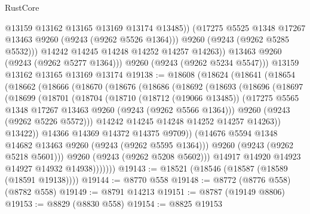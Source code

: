 \begin{lexlean}{RustCore}
\begin{coremodule}
                  @13159
                  @13162
                  @13165
                  @13169
                  @13174
                  @13485))
              (@17275 @5525 @1348 @17267 @13463 @9260 (@9243 (@9262 @5526 @1364)))
              @9260
              (@9243 (@9262 @5285 @5532)))
            @14242
            @14245
            @14248
            @14252
            @14257
            @14263))
        @13463
        @9260
        (@9243 (@9262 @5277 @1364)))
      @9260
      (@9243 (@9262 @5234 @5547)))
    @13159
    @13162
    @13165
    @13169
    @13174
@19138 := @18608
    (@18624
      (@18641
        (@18654
          (@18662
            (@18666
              (@18670
                (@18676
                  (@18686
                    (@18692
                      (@18693
                        (@18696
                          (@18697
                            (@18699
                              (@18701
                                (@18704
                                  (@18710
                                    (@18712 (@19066 @13485))
                                    (@17275
                                      @5565
                                      @1348
                                      @17267
                                      @13463
                                      @9260
                                      (@9243 (@9262 @5566 @1364)))
                                    @9260
                                    (@9243 (@9262 @5226 @5572)))
                                  @14242
                                  @14245
                                  @14248
                                  @14252
                                  @14257
                                  @14263))
                              @13422))
                          @14366
                          @14369
                          @14372
                          @14375
                          @9709))
                      (@14676 @5594 @1348 @14682 @13463 @9260 (@9243 (@9262 @5595 @1364)))
                      @9260
                      (@9243 (@9262 @5218 @5601)))
                    @9260
                    (@9243 (@9262 @5208 @5602)))
                  @14917
                  @14920
                  @14923
                  @14927
                  @14932
                  @14938)))))))
@19143 := @18521 (@18546 (@18587 (@18589 (@18591 @19138))))
@19144 := @8770 @558
@19148 := @8772 (@8776 @558) (@8782 @558)
@19149 := @8791 @14213
@19151 := @8787 (@19149 @8806)
@19153 := @8829 (@8830 @558)
@19154 := @8825 @19153

\end{coremodule}
\end{lexlean}

